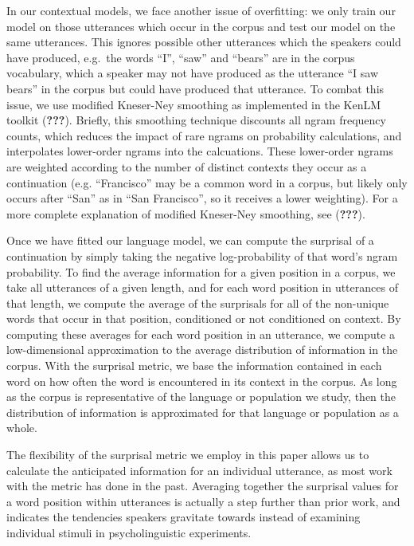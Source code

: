 \documentclass[10pt, letterpaper]{article}
\begin{document}
In our contextual models, we face another issue of overfitting: we only
train our model on those utterances which occur in the corpus and test
our model on the same utterances. This ignores possible other utterances
which the speakers could have produced, e.g.~the words ``I'', ``saw''
and ``bears'' are in the corpus vocabulary, which a speaker may not have
produced as the utterance ``I saw bears'' in the corpus but could have
produced that utterance. To combat this issue, we use modified
Kneser-Ney smoothing as implemented in the KenLM toolkit
({\textbf{???}}). Briefly, this smoothing technique discounts all ngram
frequency counts, which reduces the impact of rare ngrams on probability
calculations, and interpolates lower-order ngrams into the calcuations.
These lower-order ngrams are weighted according to the number of
distinct contexts they occur as a continuation (e.g. ``Francisco'' may
be a common word in a corpus, but likely only occurs after ``San'' as in
``San Francisco'', so it receives a lower weighting). For a more
complete explanation of modified Kneser-Ney smoothing, see
({\textbf{???}}).

Once we have fitted our language model, we can compute the surprisal of
a continuation by simply taking the negative log-probability of that
word's ngram probability. To find the average information for a given
position in a corpus, we take all utterances of a given length, and for
each word position in utterances of that length, we compute the average
of the surprisals for all of the non-unique words that occur in that
position, conditioned or not conditioned on context. By computing these
averages for each word position in an utterance, we compute a
low-dimensional approximation to the average distribution of information
in the corpus. With the surprisal metric, we base the information
contained in each word on how often the word is encountered in its
context in the corpus. As long as the corpus is representative of the
language or population we study, then the distribution of information is
approximated for that language or population as a whole.

The flexibility of the surprisal metric we employ in this paper allows
us to calculate the anticipated information for an individual utterance,
as most work with the metric has done in the past. Averaging together
the surprisal values for a word position within utterances is actually a
step further than prior work, and indicates the tendencies speakers
gravitate towards instead of examining individual stimuli in
psycholinguistic experiments.
\end{document}
